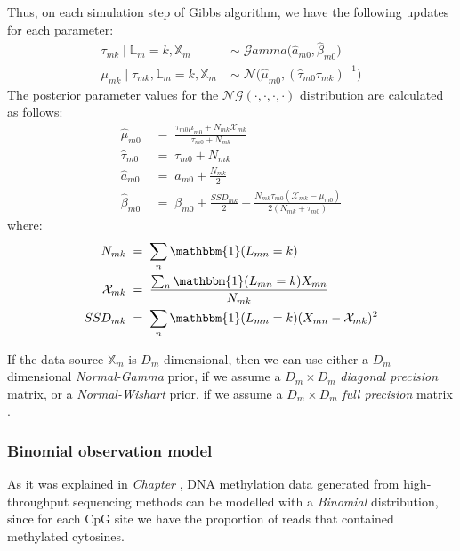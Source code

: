 Thus, on each simulation step of Gibbs algorithm, we have the following updates for each parameter:
\begin{equation}
  \begin{aligned}
  	\tau_{mk} \mid \mathbb{L}_{m}=k, \mathbb{X}_{m} \;& \sim \;\mathcal{G}amma\big(\hat{\mathit{a}}_{m0}, \hat{\beta}_{m0}\big) \\
	\mu_{mk} \mid \tau_{mk}, \mathbb{L}_{m}=k, \mathbb{X}_{m} \; & \sim \; \mathcal{N}\big(\hat{\mu}_{m0}, (\hat{\tau}_{m0} \tau_{mk})^{-1}\big)
  \end{aligned}
\end{equation}
The posterior parameter values for the $\mathcal{NG}(\cdot,\cdot,\cdot,\cdot)$ distribution are calculated as follows:
\begin{equation}
  \begin{aligned}
  	\hat{\mu}_{m0} \; &= \; \frac{\tau_{m0}\mu_{m0} + N_{mk}\mathcal{X}_{mk}}{\tau_{m0} + N_{mk}}\\
  	\hat{\tau}_{m0} \; &= \; \tau_{m0} + N_{mk}\\
  	\hat{\mathit{a}}_{m0} \; &= \; \mathit{a}_{m0} + \frac{N_{mk}}{2}\\
  	\hat{\beta}_{m0} \; &= \; \beta_{m0} + \frac{SSD_{mk}}{2} + \frac{N_{mk}\tau_{m0}(\mathcal{X}_{mk} - \mu_{m0})}{2(N_{mk}+\tau_{m0})}
  \end{aligned}
\end{equation}
where: 
\begin{equation}
  \begin{aligned}
		N_{mk} \; &= \; \sum_{n}\mathbbm{1}(L_{mn}=k)\\ 
		\mathcal{X}_{mk} \; &= \; \frac{\sum_{n}\mathbbm{1}(L_{mn}=k)X_{mn}}{N_{mk}} \\
		SSD_{mk} \; &= \; \sum_{n}\mathbbm{1}(L_{mn}=k)(X_{mn}-\mathcal{X}_{mk})^{2}
  \end{aligned}
\end{equation} 

If the data source $\mathbb{X}_{m}$ is $D_{m}$-dimensional, then we can use either a $D_{m}$ dimensional \emph{Normal-Gamma} prior, if we assume a $D_{m} \times D_{m}$ \emph{diagonal precision} matrix, or a \emph{Normal-Wishart} prior, if we assume a $D_{m} \times D_{m}$ \emph{full precision} matrix \cite[Ch. 2]{Bishop2006}.

\subsubsection*{Binomial observation model}
As it was explained in \emph{Chapter }, DNA methylation data generated from high-throughput sequencing methods can be modelled with a \emph{Binomial} distribution, since for each CpG site we have the proportion of reads that contained methylated cytosines.

